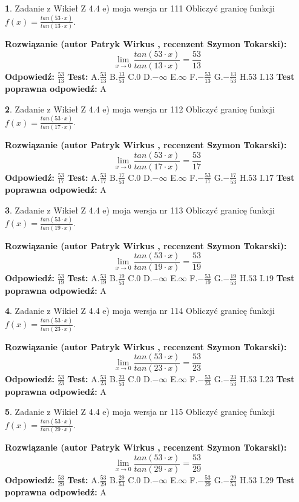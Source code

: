 \documentclass[12pt, a4paper]{article}
\theoremstyle{definition} %
\newtheorem{zad}{}
\newcommand{\zadStart}[1]{\begin{zad}#1\newline}
\newcommand{\zadStop}{\end{zad}}
\newcommand{\rozwStart}[2]{\noindent \textbf{Rozwiązanie (autor #1 , recenzent #2): }\newline}
\newcommand{\rozwStop}{\newline}
\newcommand{\odpStart}{\noindent \textbf{Odpowiedź:}\newline}
\newcommand{\odpStop}{\newline}
\newcommand{\testStart}{\noindent \textbf{Test:}\newline}
\newcommand{\testStop}{\newline}
\newcommand{\kluczStart}{\noindent \textbf{Test poprawna odpowiedź:}\newline}
\newcommand{\kluczStop}{\newline}
\begin{document}
\zadStart{Zadanie z Wikieł Z 4.4 e) moja wersja nr 111}
Obliczyć granicę funkcji $f(x)=\frac{tan(53\cdot x)}{tan(13\cdot x)}$.
\zadStop
\rozwStart{Patryk Wirkus}{Szymon Tokarski}
$$\lim\limits_{x\to 0}\frac{tan(53\cdot x)}{tan(13\cdot x)}=
\frac{53}{13}$$
\rozwStop
\odpStart
$\frac{53}{13}$
\odpStop
\testStart
A.$\frac{53}{13}$
B.$\frac{13}{53}$
C.$0$
D.$-\infty$
E.$\infty$
F.$-\frac{53}{13}$
G.$-\frac{13}{53}$
H.$53$
I.$13$
\testStop
\kluczStart
A
\kluczStop



\zadStart{Zadanie z Wikieł Z 4.4 e) moja wersja nr 112}
Obliczyć granicę funkcji $f(x)=\frac{tan(53\cdot x)}{tan(17\cdot x)}$.
\zadStop
\rozwStart{Patryk Wirkus}{Szymon Tokarski}
$$\lim\limits_{x\to 0}\frac{tan(53\cdot x)}{tan(17\cdot x)}=
\frac{53}{17}$$
\rozwStop
\odpStart
$\frac{53}{17}$
\odpStop
\testStart
A.$\frac{53}{17}$
B.$\frac{17}{53}$
C.$0$
D.$-\infty$
E.$\infty$
F.$-\frac{53}{17}$
G.$-\frac{17}{53}$
H.$53$
I.$17$
\testStop
\kluczStart
A
\kluczStop



\zadStart{Zadanie z Wikieł Z 4.4 e) moja wersja nr 113}
Obliczyć granicę funkcji $f(x)=\frac{tan(53\cdot x)}{tan(19\cdot x)}$.
\zadStop
\rozwStart{Patryk Wirkus}{Szymon Tokarski}
$$\lim\limits_{x\to 0}\frac{tan(53\cdot x)}{tan(19\cdot x)}=
\frac{53}{19}$$
\rozwStop
\odpStart
$\frac{53}{19}$
\odpStop
\testStart
A.$\frac{53}{19}$
B.$\frac{19}{53}$
C.$0$
D.$-\infty$
E.$\infty$
F.$-\frac{53}{19}$
G.$-\frac{19}{53}$
H.$53$
I.$19$
\testStop
\kluczStart
A
\kluczStop



\zadStart{Zadanie z Wikieł Z 4.4 e) moja wersja nr 114}
Obliczyć granicę funkcji $f(x)=\frac{tan(53\cdot x)}{tan(23\cdot x)}$.
\zadStop
\rozwStart{Patryk Wirkus}{Szymon Tokarski}
$$\lim\limits_{x\to 0}\frac{tan(53\cdot x)}{tan(23\cdot x)}=
\frac{53}{23}$$
\rozwStop
\odpStart
$\frac{53}{23}$
\odpStop
\testStart
A.$\frac{53}{23}$
B.$\frac{23}{53}$
C.$0$
D.$-\infty$
E.$\infty$
F.$-\frac{53}{23}$
G.$-\frac{23}{53}$
H.$53$
I.$23$
\testStop
\kluczStart
A
\kluczStop



\zadStart{Zadanie z Wikieł Z 4.4 e) moja wersja nr 115}
Obliczyć granicę funkcji $f(x)=\frac{tan(53\cdot x)}{tan(29\cdot x)}$.
\zadStop
\rozwStart{Patryk Wirkus}{Szymon Tokarski}
$$\lim\limits_{x\to 0}\frac{tan(53\cdot x)}{tan(29\cdot x)}=
\frac{53}{29}$$
\rozwStop
\odpStart
$\frac{53}{29}$
\odpStop
\testStart
A.$\frac{53}{29}$
B.$\frac{29}{53}$
C.$0$
D.$-\infty$
E.$\infty$
F.$-\frac{53}{29}$
G.$-\frac{29}{53}$
H.$53$
I.$29$
\testStop
\kluczStart
A
\kluczStop
\end{document}
